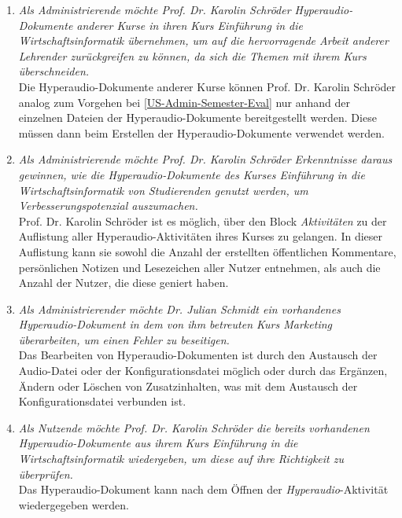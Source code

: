 \begin{enumerate}[label=US-\arabic*:,ref=US-\arabic*]
\item \label{US-Admin-Kurs-Eval} \textit{Als Administrierende möchte Prof. Dr. Karolin Schröder Hyperaudio-Dokumente anderer Kurse in ihren Kurs \glqq Einführung in die Wirtschaftsinformatik\grqq{} übernehmen, um auf die hervorragende Arbeit anderer Lehrender zurückgreifen zu können, da sich die Themen mit ihrem Kurs überschneiden.}\\
Die Hyperaudio-Dokumente anderer Kurse können Prof. Dr. Karolin Schröder analog zum Vorgehen bei \ref{US-Admin-Semester-Eval} nur anhand der einzelnen Dateien der Hyperaudio-Dokumente bereitgestellt werden. Diese müssen dann beim Erstellen der Hyperaudio-Dokumente verwendet werden.

\item \label{US-Admin-Statistik-Eval} \textit{Als Administrierende möchte Prof. Dr. Karolin Schröder Erkenntnisse daraus gewinnen, wie die Hyperaudio-Dokumente des Kurses \glqq Einführung in die Wirtschaftsinformatik\grqq{} von Studierenden genutzt werden, um Verbesserungspotenzial auszumachen.}\\
Prof. Dr. Karolin Schröder ist es möglich, über den Block \textit{Aktivitäten} zu der Auflistung aller Hyperaudio-Aktivitäten ihres Kurses zu gelangen. In dieser Auflistung kann sie sowohl die Anzahl der erstellten öffentlichen Kommentare, persönlichen Notizen und Lesezeichen aller Nutzer entnehmen, als auch die Anzahl der Nutzer, die diese geniert haben.

\item \label{US-Admin-Bearbeiten-Eval} \textit{Als Administrierender möchte Dr. Julian Schmidt ein vorhandenes Hyperaudio-Dokument in dem von ihm betreuten Kurs \glqq Marketing\grqq{} überarbeiten, um einen Fehler zu beseitigen.}\\
Das Bearbeiten von Hyperaudio-Dokumenten ist durch den Austausch der Audio-Datei oder der Konfigurationsdatei möglich oder durch das Ergänzen, Ändern oder Löschen von Zusatzinhalten, was mit dem Austausch der Konfigurationsdatei verbunden ist.

\item \label{US-Wiedergabe-Eval} \textit{Als Nutzende möchte Prof. Dr. Karolin Schröder die bereits vorhandenen Hyperaudio-Dokumente aus ihrem Kurs \glqq Einführung in die Wirtschaftsinformatik\grqq{} wiedergeben, um diese auf ihre Richtigkeit zu überprüfen.}\\
Das Hyperaudio-Dokument kann nach dem Öffnen der \textit{Hyperaudio}-Aktivität wiedergegeben werden.


\end{enumerate}
